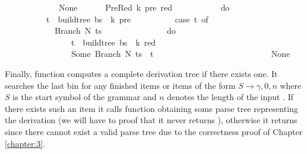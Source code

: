 \begin{isabellebody}
\ \ \ \ \ \ \ \ \ \ {\isacharbar}{\kern0pt}\ {\isacharunderscore}{\kern0pt}\ {\isasymRightarrow}\ None\ {\isacharbraceright}{\kern0pt}{\isacharparenright}{\kern0pt}\isanewline
\ \ \ \ {\isacharbar}{\kern0pt}\ PreRed\ {\isacharparenleft}{\kern0pt}k{\isacharprime}{\kern0pt}{\isacharcomma}{\kern0pt}\ pre{\isacharcomma}{\kern0pt}\ red{\isacharparenright}{\kern0pt}\ {\isacharunderscore}{\kern0pt}\ {\isasymRightarrow}\ {\isacharparenleft}{\kern0pt}\isanewline
\ \ \ \ \ \ \ \ do\ {\isacharbraceleft}{\kern0pt}\isanewline
\ \ \ \ \ \ \ \ \ \ t\ {\isasymleftarrow}\ build{\isacharunderscore}{\kern0pt}tree{\isacharprime}{\kern0pt}\ bs\ {\isasymomega}\ k{\isacharprime}{\kern0pt}\ pre{\isacharsemicolon}{\kern0pt}\isanewline
\ \ \ \ \ \ \ \ \ \ case\ t\ of\isanewline
\ \ \ \ \ \ \ \ \ \ \ \ Branch\ N\ ts\ {\isasymRightarrow}\isanewline
\ \ \ \ \ \ \ \ \ \ \ \ \ \ do\ {\isacharbraceleft}{\kern0pt}\isanewline
\ \ \ \ \ \ \ \ \ \ \ \ \ \ \ \ t\ {\isasymleftarrow}\ build{\isacharunderscore}{\kern0pt}tree{\isacharprime}{\kern0pt}\ bs\ {\isasymomega}\ k\ red{\isacharsemicolon}{\kern0pt}\isanewline
\ \ \ \ \ \ \ \ \ \ \ \ \ \ \ \ Some\ {\isacharparenleft}{\kern0pt}Branch\ N\ {\isacharparenleft}{\kern0pt}ts\ {\isacharat}{\kern0pt}\ {\isacharbrackleft}{\kern0pt}t{\isacharbrackright}{\kern0pt}{\isacharparenright}{\kern0pt}{\isacharparenright}{\kern0pt}\isanewline
\ \ \ \ \ \ \ \ \ \ \ \ \ \ {\isacharbraceright}{\kern0pt}\isanewline
\ \ \ \ \ \ \ \ \ \ {\isacharbar}{\kern0pt}\ {\isacharunderscore}{\kern0pt}\ {\isasymRightarrow}\ None\ {\isacharbraceright}{\kern0pt}{\isacharparenright}{\kern0pt}{\isacharparenright}{\kern0pt}{\isacharparenright}{\kern0pt}{\isachardoublequoteclose}%
\begin{isamarkuptext}%
Finally, function  computes a complete derivation tree if there exists one. It searches the last bin for any finished items or items of the form
$S \rightarrow \gamma, 0, n$ where $S$ is the start symbol of the grammar \isa{{\isasymG}} and $n$ denotes
the length of the input \isa{{\isasymomega}}. If there exists such an item it calls function 
obtaining some parse tree representing the derivation  (we will have to proof that it never returns ),
otherwise it returns  since there cannot exist a valid parse tree due to the correctness
proof of Chapter \ref{chapter:3}.%
\end{isamarkuptext}\isamarkuptrue%

\end{isabellebody}
